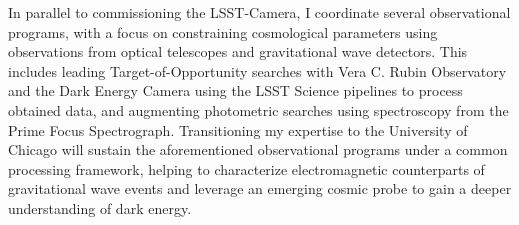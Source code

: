 \documentclass[10pt]{article}
\begin{document}

In parallel to commissioning the LSST-Camera, I coordinate several observational programs, with a focus on constraining cosmological parameters using observations from optical telescopes and gravitational wave detectors. This includes leading Target-of-Opportunity searches with Vera C. Rubin Observatory and the Dark Energy Camera using the LSST Science pipelines to process obtained data, and augmenting photometric searches using spectroscopy from the Prime Focus Spectrograph. 
\textcolor{\tcolor}{Transitioning my expertise to the University of Chicago will sustain the aforementioned observational programs under a common processing framework, helping to characterize electromagnetic counterparts of gravitational wave events and leverage an emerging cosmic probe to gain a deeper understanding of dark energy.} 

\end{document}
